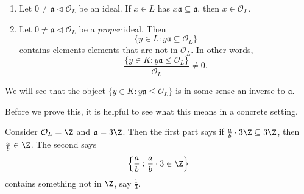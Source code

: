 \documentclass[a4paper]{article}
\begin{document}
\begin{prop}\leavevmode
  \begin{enumerate}
    \item Let $0 \not= \mathfrak{a} \lhd \mathcal{O}_L$ be an ideal. If $x \in L$ has $x\mathfrak{a} \subseteq \mathfrak{a}$, then $x \in \mathcal{O}_L$.
    \item Let $0 \not= \mathfrak{a} \lhd \mathcal{O}_L$ be a \emph{proper} ideal. Then
      \[
        \{y \in L: y \mathfrak{a} \subseteq \mathcal{O}_L\}
      \]
      contains elements elements that are not in $\mathcal{O}_L$. In other words,
      \[
        \frac{\{y \in K: y \mathfrak{a} \leq \mathcal{O}_L\}}{\mathcal{O}_L} \not = 0.
      \]
  \end{enumerate}
\end{prop}
We will see that the object $\{y \in K: y \mathfrak{a} \leq \mathcal{O}_L\}$ is in some sense an inverse to $\mathfrak{a}$.

Before we prove this, it is helpful to see what this means in a concrete setting.
\begin{eg}
  Consider $\mathcal{O}_L = \Z$ and $\mathfrak{a} = 3\Z$. Then the first part says if $\frac{a}{b} \cdot 3\Z \subseteq 3\Z$, then $\frac{a}{b} \in \Z$. The second says
  \[
    \left\{\frac{a}{b}: \frac{a}{b}\cdot 3 \in \Z\right\}
  \]
  contains something not in $\Z$, say $\frac{1}{3}$.
\end{eg}
\end{document}
